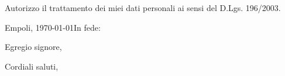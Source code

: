 \documentclass[11pt,a4paper]{moderncv}
\begin{document}

\bigskip

\tiny\vspace{\fill}
\footnotesize\noindent\centering
Autorizzo il trattamento dei miei dati personali ai sensi del D.Lgs. 196/2003.
\vspace*{0.25cm}

Empoli, \today\hfill  In fede:

\vfill



\clearpage

\date{\today} %
\opening{Egregio signore,} %
\closing{Cordiali saluti,} %

\makelettertitle %

\lipsum[1-3] %

\makeletterclosing %

\end{document}
